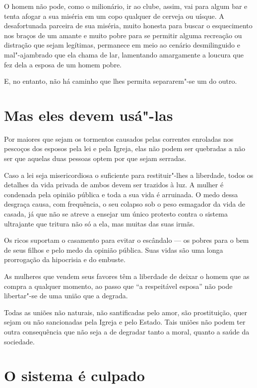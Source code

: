 O homem não pode, como o milionário, ir ao clube, assim, vai para algum
bar e tenta afogar a sua miséria em um copo qualquer de cerveja ou
uísque. A desafortunada parceira de sua miséria, muito honesta
para buscar o esquecimento nos braços de um amante e muito pobre para se
permitir alguma recreação ou distração que sejam legítimas, permanece em
meio ao cenário desmilinguido e mal"-ajambrado que ela chama de lar,
lamentando amargamente a loucura que fez dela a esposa de um homem
pobre.

E, no entanto, não há caminho que lhes permita separarem"-se um do outro.

\section{Mas eles devem usá"-las}

Por maiores que sejam os tormentos causados pelas correntes
enroladas nos pescoços dos esposos pela lei e pela Igreja, elas não podem ser quebradas
a não ser que aquelas duas pessoas optem por que sejam serradas.

Caso a lei seja misericordiosa o suficiente para restituir"-lhes a liberdade,
todos os detalhes da vida privada de ambos devem ser
trazidos à luz. A mulher é condenada pela opinião pública e toda a sua
vida é arruinada. O medo dessa desgraça causa, com frequência, o
seu colapso sob o peso esmagador da vida de casada, já que não se atreve
a ensejar um único protesto contra o sistema ultrajante que tritura não
só a ela, mas muitas das suas irmãs.

Os ricos suportam o casamento para evitar o escândalo --- os pobres para
o bem de seus filhos e pelo medo da opinião pública. Suas vidas são uma
longa prorrogação da hipocrisia e do embuste.

As mulheres que vendem seus favores têm a liberdade de deixar o homem
que as compra a qualquer momento, ao passo que ``a respeitável esposa''
não pode libertar"-se de uma união que a degrada.

Todas as uniões não naturais, não santificadas pelo amor, são
prostituição, quer sejam ou não sancionadas pela Igreja e pelo Estado.
Tais uniões não podem ter outra consequência que não seja a de degradar
tanto a moral, quanto a saúde da sociedade.

\section{O sistema é culpado}


